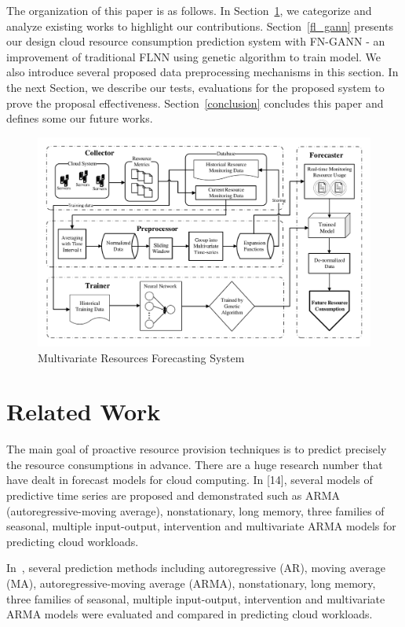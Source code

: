 \documentclass[conference]{IEEEtran}
\begin{document}
The organization of this paper is as follows. In Section~\ref{related_work}, we categorize and analyze existing works to highlight our contributions. Section~\ref{fl_gann} presents our design cloud resource consumption prediction system with FN-GANN - an improvement of traditional FLNN using genetic algorithm to train model. We also introduce several proposed data preprocessing mechanisms in this section. In the next Section, we describe our tests, evaluations for the proposed system to prove the proposal effectiveness. Section~\ref{conclusion} concludes this paper and defines some our future works.

\begin{figure}[h]
	\centerline{\includegraphics[width=0.7\textwidth =0.1cm 0.1cm 0.1cm 0.1cm, clip]{images/FLGANN_system.pdf}}
	\caption{Multivariate Resources Forecasting System}
	\label{FLGANN_system}
\end{figure}
     
\section{Related Work}
\label{related_work}

The main goal of proactive resource provision techniques is to predict precisely the resource consumptions in advance. There are a huge research number that have dealt in forecast models for cloud computing. In [14], several models of predictive time series are
proposed and demonstrated such as ARMA (autoregressive-moving average),
nonstationary, long memory, three families of seasonal, multiple input-output,
intervention and multivariate ARMA models for predicting cloud workloads.

In~\cite{ref_hipel}, several prediction methods including autoregressive (AR), moving average (MA), autoregressive-moving average (ARMA), nonstationary, long memory, three families of seasonal, multiple input-output, intervention and multivariate ARMA models were evaluated and compared in predicting cloud workloads. 
\end{document}
